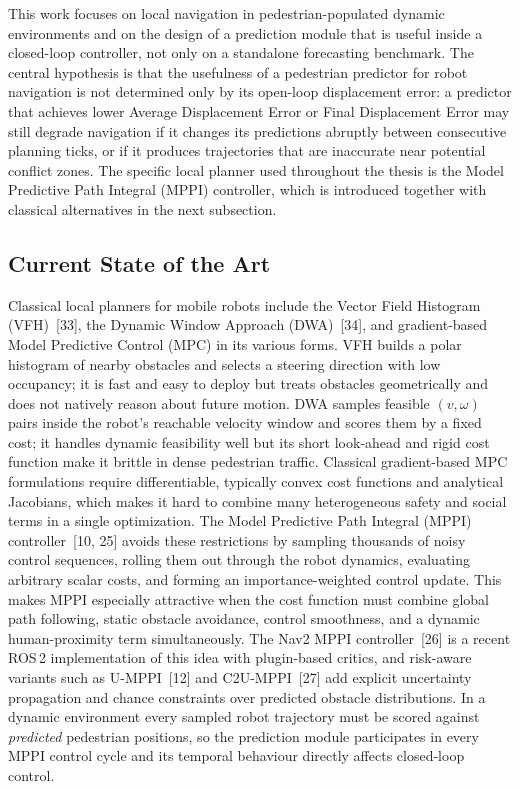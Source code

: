 \documentclass[12pt, a4paper]{article}
\begin{document}
This work focuses on local navigation in pedestrian-populated dynamic environments and on the design of a prediction module that is useful inside a closed-loop controller, not only on a standalone forecasting benchmark. The central hypothesis is that the usefulness of a pedestrian predictor for robot navigation is not determined only by its open-loop displacement error: a predictor that achieves lower Average Displacement Error or Final Displacement Error may still degrade navigation if it changes its predictions abruptly between consecutive planning ticks, or if it produces trajectories that are inaccurate near potential conflict zones. The specific local planner used throughout the thesis is the Model Predictive Path Integral (MPPI) controller, which is introduced together with classical alternatives in the next subsection.

\subsection{Current State of the Art}

Classical local planners for mobile robots include the Vector Field Histogram (VFH)~[33], the Dynamic Window Approach (DWA)~[34], and gradient-based Model Predictive Control (MPC) in its various forms. VFH builds a polar histogram of nearby obstacles and selects a steering direction with low occupancy; it is fast and easy to deploy but treats obstacles geometrically and does not natively reason about future motion. DWA samples feasible $(v,\omega)$ pairs inside the robot's reachable velocity window and scores them by a fixed cost; it handles dynamic feasibility well but its short look-ahead and rigid cost function make it brittle in dense pedestrian traffic. Classical gradient-based MPC formulations require differentiable, typically convex cost functions and analytical Jacobians, which makes it hard to combine many heterogeneous safety and social terms in a single optimization. The Model Predictive Path Integral (MPPI) controller~[10, 25] avoids these restrictions by sampling thousands of noisy control sequences, rolling them out through the robot dynamics, evaluating arbitrary scalar costs, and forming an importance-weighted control update. This makes MPPI especially attractive when the cost function must combine global path following, static obstacle avoidance, control smoothness, and a dynamic human-proximity term simultaneously. The Nav2 MPPI controller~[26] is a recent ROS\,2 implementation of this idea with plugin-based critics, and risk-aware variants such as U-MPPI~[12] and C2U-MPPI~[27] add explicit uncertainty propagation and chance constraints over predicted obstacle distributions. In a dynamic environment every sampled robot trajectory must be scored against \emph{predicted} pedestrian positions, so the prediction module participates in every MPPI control cycle and its temporal behaviour directly affects closed-loop control.
\end{document}
